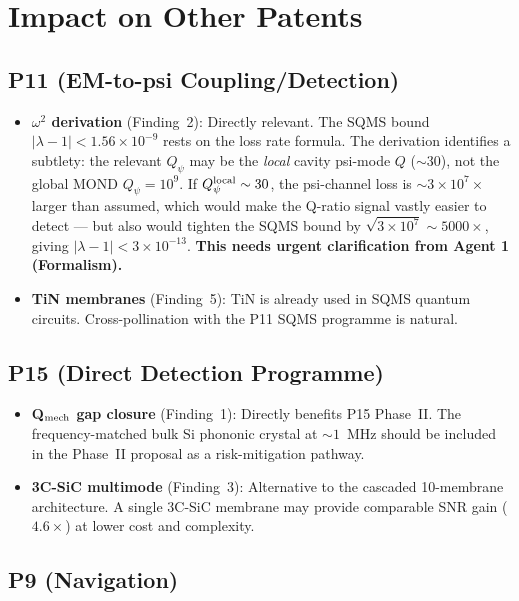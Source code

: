 \documentclass[11pt]{article}
\newcommand{\lam}{\lambda}
\newcommand{\ee}[1]{\times 10^{#1}}
\newcommand{\Qpsi}{Q_\psi}
\newcommand{\lbone}{|\lam - 1|}
\theoremstyle{definition}
\theoremstyle{remark}
\begin{document}
\section{Impact on Other Patents}

\subsection{P11 (EM-to-psi Coupling/Detection)}

\begin{itemize}[nosep]
\item \textbf{$\omega^2$ derivation} (Finding~2): Directly relevant.
  The SQMS bound $\lbone < 1.56\ee{-9}$ rests on the loss rate
  formula. The derivation identifies a subtlety: the relevant $\Qpsi$
  may be the \emph{local} cavity psi-mode $Q$ ($\sim 30$), not the
  global MOND $\Qpsi = 10^9$. If $\Qpsi^{\rm local} \sim 30$,
  the psi-channel loss is $\sim 3\ee{7}\times$ larger than assumed,
  which would make the Q-ratio signal vastly easier to detect
  --- but also would tighten the SQMS bound by $\sqrt{3\ee{7}}
  \sim 5000\times$, giving $\lbone < 3\ee{-13}$. \textbf{This
  needs urgent clarification from Agent 1 (Formalism).}
\item \textbf{TiN membranes} (Finding~5): TiN is already used in
  SQMS quantum circuits. Cross-pollination with the P11 SQMS
  programme is natural.
\end{itemize}

\subsection{P15 (Direct Detection Programme)}

\begin{itemize}[nosep]
\item \textbf{Q$_{\rm mech}$ gap closure} (Finding~1): Directly
  benefits P15 Phase~II. The frequency-matched bulk Si phononic
  crystal at $\sim 1$~MHz should be included in the Phase~II
  proposal as a risk-mitigation pathway.
\item \textbf{3C-SiC multimode} (Finding~3): Alternative to the
  cascaded 10-membrane architecture. A single 3C-SiC membrane
  may provide comparable SNR gain ($4.6\times$) at lower cost
  and complexity.
\end{itemize}

\subsection{P9 (Navigation)}
\end{document}
